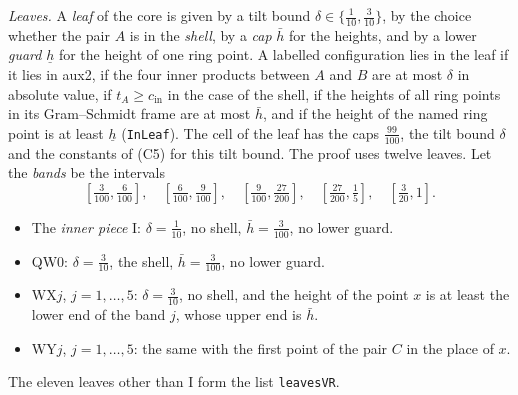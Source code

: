 \documentclass[reqno,a4paper,11pt]{amsart}
\numberwithin{equation}{section}
\newcommand{\lean}[1]{\texttt{#1}}
\begin{document}
\emph{Leaves.} A \emph{leaf} of the core is given by a tilt bound $\delta \in \{\tfrac{1}{10}, \tfrac{3}{10}\}$, by the choice whether the pair $A$ is in the \emph{shell}, by a \emph{cap} $\bar h$ for the heights, and by a lower \emph{guard} $\underline h$ for the height of one ring point. A labelled configuration lies in the leaf if it lies in aux2, if the four inner products between $A$ and $B$ are at most $\delta$ in absolute value, if $t_A \geq c_{\mathrm{in}}$ in the case of the shell, if the heights of all ring points in its Gram--Schmidt frame are at most $\bar h$, and if the height of the named ring point is at least $\underline h$ (\lean{InLeaf}). The cell of the leaf has the caps $\tfrac{99}{100}$, the tilt bound $\delta$ and the constants of (C5) for this tilt bound. The proof uses twelve leaves. Let the \emph{bands} be the intervals
$$
[\tfrac{3}{100}, \tfrac{6}{100}], \quad [\tfrac{6}{100}, \tfrac{9}{100}], \quad [\tfrac{9}{100}, \tfrac{27}{200}], \quad [\tfrac{27}{200}, \tfrac15], \quad [\tfrac{3}{20}, 1] .
$$
\begin{itemize}
    \item The \emph{inner piece} \textup{I}: $\delta = \tfrac{1}{10}$, no shell, $\bar h = \tfrac{3}{100}$, no lower guard.
    \item \textup{QW0}: $\delta = \tfrac{3}{10}$, the shell, $\bar h = \tfrac{3}{100}$, no lower guard.
    \item \textup{WX$j$}, $j = 1, \dots, 5$: $\delta = \tfrac{3}{10}$, no shell, and the height of the point $x$ is at least the lower end of the band $j$, whose upper end is $\bar h$.
    \item \textup{WY$j$}, $j = 1, \dots, 5$: the same with the first point of the pair $C$ in the place of $x$.
\end{itemize}
The eleven leaves other than \textup{I} form the list \lean{leavesVR}.
\end{document}

